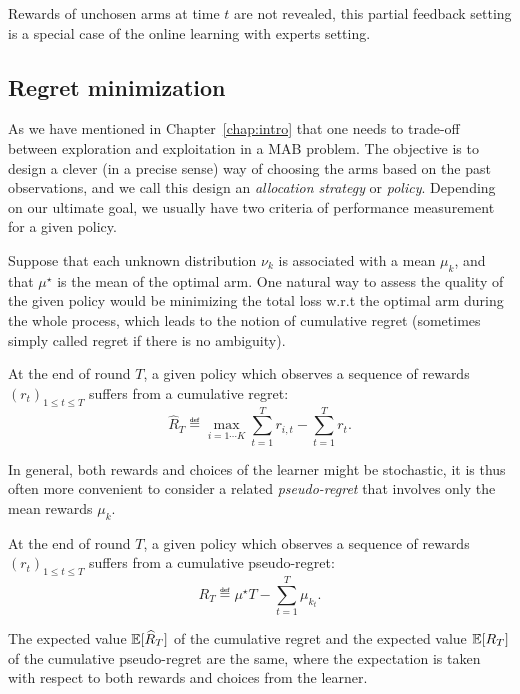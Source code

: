 \begin{remark}
	Rewards of unchosen arms at time $t$ are not revealed, this partial feedback setting is a special case of the online learning with experts setting.
\end{remark}

\subsection{Regret minimization}\label{sec:mab.regret}

As we have mentioned in Chapter~\ref{chap:intro} that one needs to trade-off between exploration and exploitation in a MAB problem. The objective is to design a clever (in a precise sense) way of choosing the arms based on the past observations, and we call this design an \emph{allocation strategy} or \emph{policy}. Depending on our ultimate goal, we usually have two criteria of performance measurement for a given policy.

Suppose that each unknown distribution $\nu_k$ is associated with a mean $\mu_k$, and that $\mu^{\star}$ is the mean of the optimal arm. One natural way to assess the quality of the given policy would be minimizing the total loss w.r.t the optimal arm during the whole process, which leads to the notion of \gls{cumulative regret} (sometimes simply called regret if there is no ambiguity).

\begin{definition}\label{def:stoch_mab.cumulative_regret}
	At the end of round $T$, a given policy which observes a sequence of rewards $(r_t)_{1 \leq t \leq T}$ suffers from a cumulative regret:
	\[
		\hat{R}_T \eqdef \max_{i=1\cdots K} \sum_{t=1}^T r_{i,t} - \sum_{t=1}^T r_t.
	\]
\end{definition}

In general, both rewards and choices of the learner might be stochastic, it is thus often more convenient to consider a related \emph{pseudo-regret} that involves only the mean rewards $\mu_k$.

\begin{definition}\label{def:stoch_mab.pseudo_regret}
	At the end of round $T$, a given policy which observes a sequence of rewards $(r_t)_{1 \leq t \leq T}$ suffers from a cumulative pseudo-regret:
	\[
		R_T \eqdef \mu^{\star}T - \sum_{t=1}^T \mu_{k_t}.
	\]
\end{definition}

\begin{proposition}\label{prop:stoch_mab.pseudo_regret}
	The expected value $\mathbb{E}[\widehat{R}_T]$ of the cumulative regret and the expected value $\mathbb{E}[R_T]$ of the cumulative pseudo-regret are the same, where the expectation is taken with respect to both rewards and choices from the learner.
\end{proposition}

